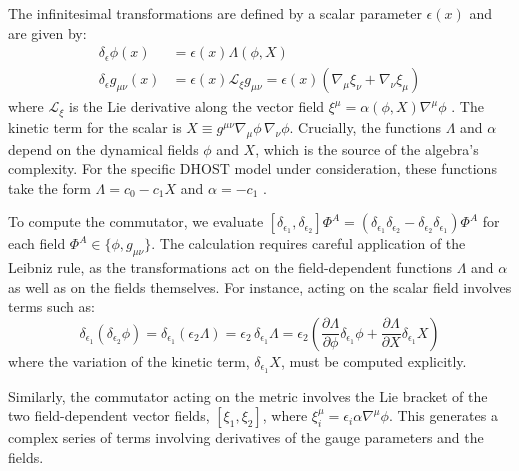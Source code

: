 \documentclass[twocolumn]{aastex631}
\begin{document}
The infinitesimal transformations are defined by a scalar parameter $\epsilon(x)$ and are given by:
\begin{align}
\delta_\epsilon \phi(x) &= \epsilon(x) \Lambda(\phi, X) \label{eq:transf_phi} \\
\delta_\epsilon g_{\mu\nu}(x) &= \epsilon(x) \mathcal{L}_{\xi} g_{\mu\nu} = \epsilon(x) (\nabla_\mu \xi_\nu + \nabla_\nu \xi_\mu) \label{eq:transf_g}
\end{align}
where $\mathcal{L}_{\xi}$ is the Lie derivative along the vector field $\xi^\mu = \alpha(\phi, X) \nabla^\mu \phi$ \citep{mukohyama2025bridgingdarkenergyblack}. The kinetic term for the scalar is $X \equiv g^{\mu\nu}\nabla_\mu\phi\,\nabla_\nu\phi$. Crucially, the functions $\Lambda$ and $\alpha$ depend on the dynamical fields $\phi$ and $X$, which is the source of the algebra's complexity. For the specific DHOST model under consideration, these functions take the form $\Lambda = c_0 - c_1 X$ and $\alpha = -c_1$ \citep{gao2019higherderivativescalartensortheory,takahashi2023invertibledisformaltransformationsarbitrary,michiwaki2026healthyscalartensortheoriesthirdorder}.

To compute the commutator, we evaluate $[\delta_{\epsilon_1}, \delta_{\epsilon_2}] \Phi^A = (\delta_{\epsilon_1}\delta_{\epsilon_2} - \delta_{\epsilon_2}\delta_{\epsilon_1})\Phi^A$ for each field $\Phi^A \in \{\phi, g_{\mu\nu}\}$. The calculation requires careful application of the Leibniz rule, as the transformations act on the field-dependent functions $\Lambda$ and $\alpha$ as well as on the fields themselves. For instance, acting on the scalar field involves terms such as:
\begin{equation}
\delta_{\epsilon_1}(\delta_{\epsilon_2}\phi) = \delta_{\epsilon_1}(\epsilon_2 \Lambda) = \epsilon_2 \, \delta_{\epsilon_1}\Lambda = \epsilon_2 \left( \frac{\partial\Lambda}{\partial\phi}\delta_{\epsilon_1}\phi + \frac{\partial\Lambda}{\partial X}\delta_{\epsilon_1}X \right)
\end{equation}
where the variation of the kinetic term, $\delta_{\epsilon_1}X$, must be computed explicitly.

Similarly, the commutator acting on the metric involves the Lie bracket of the two field-dependent vector fields, $[\xi_1, \xi_2]$, where $\xi_i^\mu = \epsilon_i \alpha \nabla^\mu \phi$. This generates a complex series of terms involving derivatives of the gauge parameters and the fields.
\end{document}
